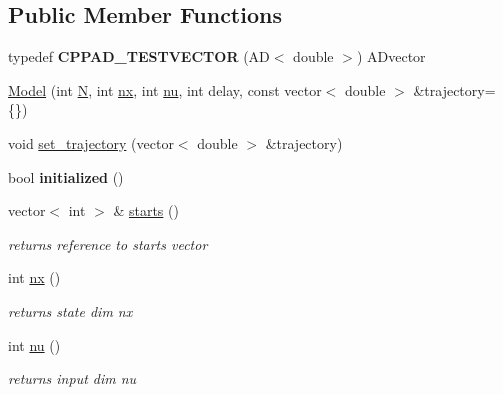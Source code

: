 \subsection*{Public Member Functions}
\begin{DoxyCompactItemize}
\item 
\mbox{\label{classModel_a5a1534764960064921f2823621a1dddb}} 
typedef {\bfseries C\+P\+P\+A\+D\+\_\+\+T\+E\+S\+T\+V\+E\+C\+T\+OR} (AD$<$ double $>$) A\+Dvector
\item 
\mbox{\hyperlink{classModel_aa480bf5dbdbf89e5221ab1aef113ece0}{Model}} (int \mbox{\hyperlink{classModel_aca776f8a10906afa8a5c362034727921}{N}}, int \mbox{\hyperlink{classModel_a951f42de158e872b5affece79521b968}{nx}}, int \mbox{\hyperlink{classModel_a0afbb992dab28ae89f1b0b114d65689c}{nu}}, int delay, const vector$<$ double $>$ \&trajectory=\{\})
\item 
void \mbox{\hyperlink{classModel_a98b6f05729855e93672272f5a9763566}{set\+\_\+trajectory}} (vector$<$ double $>$ \&trajectory)
\item 
\mbox{\label{classModel_a13639c921a1b81ae17f349bf866deb9d}} 
bool {\bfseries initialized} ()
\item 
\mbox{\label{classModel_a206c5adc8789eed1598f61be030247af}} 
vector$<$ int $>$ \& \mbox{\hyperlink{classModel_a206c5adc8789eed1598f61be030247af}{starts}} ()
\begin{DoxyCompactList}\small\item\em returns reference to starts vector \end{DoxyCompactList}\item 
\mbox{\label{classModel_a951f42de158e872b5affece79521b968}} 
int \mbox{\hyperlink{classModel_a951f42de158e872b5affece79521b968}{nx}} ()
\begin{DoxyCompactList}\small\item\em returns state dim nx \end{DoxyCompactList}\item 
\mbox{\label{classModel_a0afbb992dab28ae89f1b0b114d65689c}} 
int \mbox{\hyperlink{classModel_a0afbb992dab28ae89f1b0b114d65689c}{nu}} ()
\begin{DoxyCompactList}\small\item\em returns input dim nu \end{DoxyCompactList}\item 

\end{DoxyCompactItemize}
